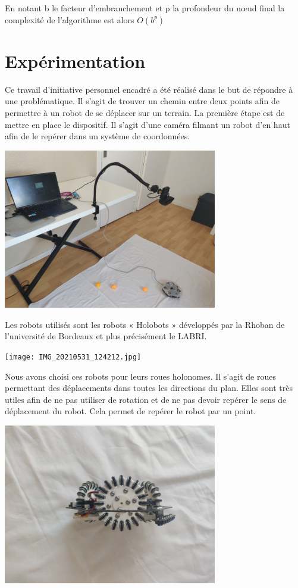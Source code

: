 En notant b le facteur d’embranchement et p la profondeur du nœud final la complexité de l’algorithme est alors $O(b^p)$

\section{Expérimentation}

Ce travail d’initiative personnel encadré a été réalisé dans le but de répondre à une problématique. Il s’agit de trouver un 
chemin entre deux points afin de permettre à un robot de se déplacer sur un terrain.
La première étape est de mettre en place le dispositif. Il s’agit d’une caméra filmant un robot d’en haut afin de le repérer 
dans un système de coordonnées. 

\begin{center}
    \includegraphics[height=7cm]{montage.jpg}
\end{center}

Les robots utilisés sont les robots « Holobots » développés par la Rhoban de l’université de 
Bordeaux et plus précisément le LABRI.

\begin{center}
    \texttt{[image: IMG\_20210531\_124212.jpg]}
\end{center}

Nous avons choisi ces robots pour leurs roues holonomes. Il s’agit de roues permettant des déplacements dans toutes les 
directions du plan. Elles sont très utiles afin de ne pas utiliser de rotation et de ne pas devoir repérer le sens de déplacement 
du robot. Cela permet de repérer le robot par un point.


\begin{center}
    \includegraphics[height=7cm]{IMG_20210531_124303.jpg}
\end{center}

